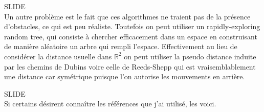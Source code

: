 \documentclass[12pt,a4paper]{article}
\newcommand{\slide}{\vspace{0.6cm}SLIDE\\}
\begin{document}
	\slide
	
	Un autre problème est le fait que ces algorithmes ne traient pas de la présence d'obstacles, ce qui est peu réaliste. Toutefois on peut utiliser un rapidly-exploring random tree, qui consiste à chercher efficacement dans un espace en construisant de manière aléatoire un arbre qui rempli l'espace. Effectivement au lieu de considérer la distance usuelle dans $\mathbb{R}^2$ on peut utiliser la pseudo distance induite par les chemins de Dubins voire celle de Reeds-Shepp qui est vraisemblablement une distance car symétrique puisque l'on autorise les mouvements en arrière.
	
	
	\slide
	
	Si certains désirent connaître les références que j'ai utilisé, les voici.
\end{document}
